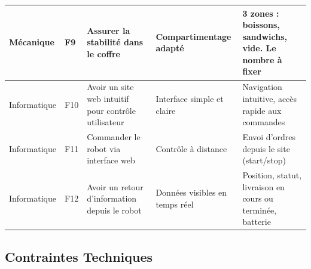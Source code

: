 \documentclass[a4paper,12pt]{report}  %
\begin{document}
{\begin{longtable}{|l|l|p{4cm}|p{4cm}|p{4cm}|}
		\hline
		Mécanique & F9 & Assurer la stabilité dans le coffre & Compartimentage adapté & 3 zones : boissons, sandwichs, vide. Le nombre à fixer \\
		
		\hline
		Informatique & F10 & Avoir un site web intuitif pour contrôle utilisateur & Interface simple et claire & Navigation intuitive, accès rapide aux commandes \\
		
		\hline
		Informatique & F11 & Commander le robot via interface web & Contrôle à distance & Envoi d'ordres depuis le site (start/stop) \\
		
		\hline
		Informatique & F12 & Avoir un retour d'information depuis le robot & Données visibles en temps réel & Position, statut, livraison en cours ou terminée, batterie \\
		
	\end{longtable}
}

\pagebreak
\subsection{Contraintes Techniques}
\end{document}
